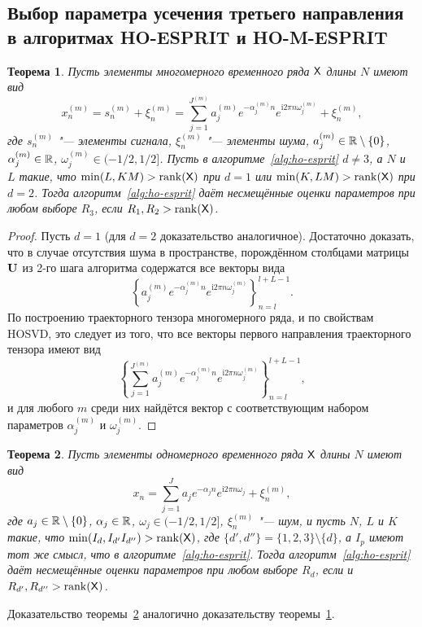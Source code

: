\documentclass[specialist,
  substylefile=spbu_report.rtx,
subf,href,colorlinks=true, 12pt]{disser}
\theoremstyle{plain}
\newtheorem{theorem}{Теорема}
\theoremstyle{definition}
\theoremstyle{remark}
\newcommand{\iu}{\mathrm{i}}
\begin{document}
\subsection{Выбор параметра усечения третьего направления в алгоритмах
HO-ESPRIT и HO-M-ESPRIT}\label{subsec:ho-esprit-r3}
\begin{theorem}\label{theorem:ho-m-esprit-r3}
  Пусть элементы многомерного временного ряда $\mathsf{X}$ длины $N$ имеют вид
  \begin{equation*}
    x_n^{(m)} = s_n^{(m)} + \xi_n^{(m)} = \sum_{j=1}^{J^{(m)}}
    a_j^{(m)} e^{-\alpha_j^{(m)} n} e^{\iu
    2 \pi n \omega_j^{(m)}} + \xi_n^{(m)},
  \end{equation*}
  где $s_n^{(m)}$ "--- элементы сигнала, $\xi_n^{(m)}$ "--- элементы шума,
  $a_j^{(m)} \in \mathbb{R} \setminus \{0\}$, $\alpha_j^{(m)} \in \mathbb{R}$,
  $\omega_j^{(m)} \in (-1/2, 1/2]$.
  Пусть в алгоритме~\ref{alg:ho-esprit} $d \ne 3$, а $N$ и $L$ такие,
  что $\min(L, KM) > \operatorname{rank}(\mathsf{X})$
  при $d=1$ или $\min(K, LM) > \operatorname{rank}(\mathsf{X})$ при $d=2$.
  Тогда алгоритм~\ref{alg:ho-esprit} даёт несмещённые оценки
  параметров при любом выборе $R_3$, если $R_1, R_2 >
  \operatorname{rank}(\mathsf{X})$.
\end{theorem}
\begin{proof}
  Пусть $d = 1$ (для $d=2$ доказательство аналогичное). Достаточно
  доказать, что в случае отсутствия шума в пространстве, порождённом столбцами
  матрицы $\mathbf{U}$ из 2-го шага алгоритма содержатся все векторы вида
  \[
    \left\{a_j^{(m)} e^{-\alpha_j^{(m)} n} e^{\iu
    2 \pi n \omega_j^{(m)}}\right\}_{n=l}^{l+L-1}.
  \]
  По построению траекторного тензора многомерного ряда, и по
  свойствам HOSVD, это
  следует из того, что все векторы первого направления траекторного
  тензора имеют вид
  \[
    \left\{\sum_{j=1}^{J^{(m)}} a_j^{(m)} e^{-\alpha_j^{(m)} n} e^{\iu
    2 \pi n \omega_j^{(m)}}\right\}_{n=l}^{l + L - 1},
  \]
  и для любого $m$ среди них найдётся вектор с соответствующим
  набором параметров $\alpha_j^{(m)}$ и $\omega_j^{(m)}$.
\end{proof}

\begin{theorem}\label{theorem:ho-esprit-r3}
  Пусть элементы одномерного временного ряда $\mathsf{X}$ длины $N$ имеют вид
  \begin{equation*}
    x_n = \sum_{j=1}^{J} a_j e^{-\alpha_j n} e^{\iu
    2 \pi n \omega_j} + \xi_n^{(m)},
  \end{equation*}
  где $a_j \in \mathbb{R} \setminus \{0\}$, $\alpha_j \in \mathbb{R}$, $\omega_j
  \in (-1/2, 1/2]$, $\xi_n^{(m)}$ "--- шум,
  и пусть $N$, $L$ и $K$ такие, что $\min(I_d, I_{d'}
  I_{d''}) >
  \operatorname{rank}(\mathsf{X})$, где $\{d', d''\} = \{1, 2, 3\}\setminus\{d\}$,
  а $I_p$ имеют тот же смысл, что в алгоритме~\ref{alg:ho-esprit}.
  Тогда алгоритм~\ref{alg:ho-esprit} даёт несмещённые оценки
  параметров при любом выборе $R_d$, если  и $R_{d'}, R_{d''} >
  \operatorname{rank}(\mathsf{X})$.
\end{theorem}
Доказательство теоремы~\ref{theorem:ho-esprit-r3} аналогично
доказательству теоремы~\ref{theorem:ho-m-esprit-r3}.
\end{document}
